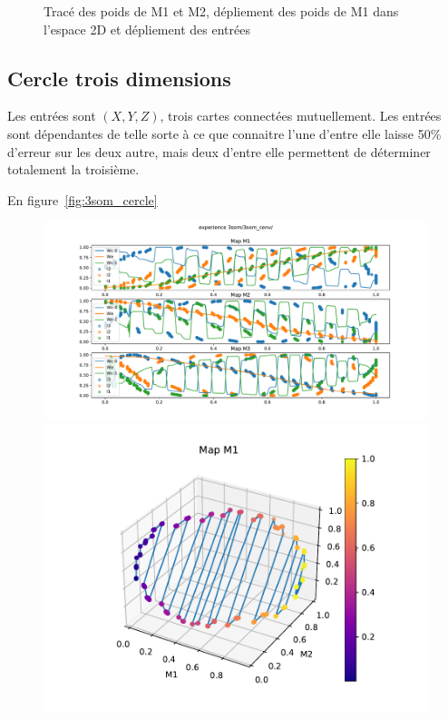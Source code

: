\begin{figure}[h!]
\begin{minipage}{0.33\textwidth}
\end{minipage}
\label{fig:2som_square}
\caption{Tracé des poids de M1 et M2, dépliement des poids de M1 dans l'espace 2D et dépliement des entrées}
\end{figure}

\subsection{Cercle trois dimensions}

Les entrées sont $(X,Y,Z)$, trois cartes connectées mutuellement. Les entrées sont dépendantes de telle sorte à ce que connaitre l'une d'entre elle laisse 50\% d'erreur sur les deux autre, mais deux d'entre elle permettent de déterminer totalement la troisième. 

En figure~\ref{fig:3som_cercle}
\begin{figure}[h!]
\begin{minipage}{0.33\textwidth}
\includegraphics[width=\textwidth]{3som_cercle_w}
\end{minipage}
\begin{minipage}{0.33\textwidth}
\includegraphics[width=\textwidth]{3som_cercle_dw1}

\end{minipage}
\end{figure}
